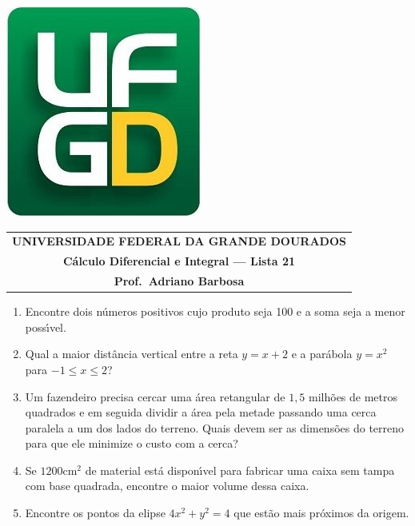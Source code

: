 \documentclass[a4paper,5pt]{amsbook}
\begin{document}
\thispagestyle{empty}
\pagestyle{empty}
\begin{minipage}[h]{0.14\textwidth}
	\includegraphics[scale=0.24]{../ufgd.png}
\end{minipage}
\begin{minipage}[h]{\textwidth}
\begin{tabular}{c}
{{\bf UNIVERSIDADE FEDERAL DA GRANDE DOURADOS}}\\
{{\bf C\'alculo Diferencial e Integral --- Lista 21}}\\
{{\bf Prof.\ Adriano Barbosa}}\\
\end{tabular}
\vspace{-0.45cm}
%
\end{minipage}


\vspace{1cm}
\begin{enumerate}
    \vspace{0.5cm}
    \item Encontre dois n\'umeros positivos cujo produto seja 100 e a soma seja a menor poss\'{\i}vel.

    \vspace{0.5cm}
    \item Qual a maior dist\^ancia vertical entre a reta $y=x+2$ e a par\'abola $y=x^2$ para $-1\le x \le 2$?

    \vspace{0.5cm}
    \item Um fazendeiro precisa cercar uma \'area retangular de $1,5$ milh\~oes de metros
        quadrados e em seguida dividir a \'area pela metade passando uma cerca paralela a um
        dos lados do terreno. Quais devem ser as dimens\~oes do terreno para que ele
        minimize o custo com a cerca?

    \vspace{0.5cm}
    \item Se $1200$cm$^2$ de material est\'a dispon\'{\i}vel para fabricar uma caixa
        sem tampa com base quadrada, encontre o maior volume dessa caixa.

    \vspace{0.5cm}
    \item Encontre os pontos da elipse $4x^2+y^2=4$ que est\~ao mais pr\'oximos da origem.
\end{enumerate}
\end{document}
